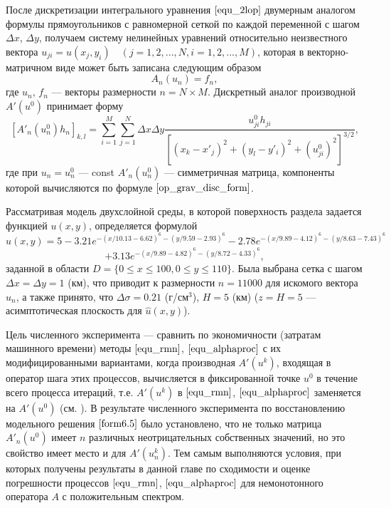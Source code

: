 После дискретизации интегрального уравнения $\eqref{equ_2lop}$ двумерным аналогом формулы прямоугольников с равномерной сеткой по каждой переменной с шагом $\Delta x$, $\Delta y$, получаем систему нелинейных уравнений относительно неизвестного вектора $u_{ji}=u(x_j,y_i)\quad (j=1,2,...,N, i=1,2,...,M)$, которая в векторно-матричном виде может быть записана следующим образом
\begin{equation}\label{equ_snle}
	A_n(u_n)=f_n,
\end{equation}
где $u_n$, $f_n$ --- векторы размерности $n=N\times M$. Дискретный аналог производной $A'(u^0)$ принимает форму
\begin{equation}\label{op_grav_disc_form}
	[A'_n(u_n^0)h_n]_{k,l}=\sum\limits_{i=1}^{M}\sum\limits_{j=1}^{N}
	\Delta x\Delta y\frac{u^0_{ji}h_{ji}}{[(x_k-x'_j)^2+(y_l-y'_i)^2+(u^0_{ji})^2]^{3/2}},
\end{equation}
где при $u_n=u_{n}^{0}$ --- const $A'_n(u_n^0)$ --- симметричная матрица, компоненты которой вычисляются по формуле $\eqref{op_grav_disc_form}$.

Рассматривая модель двухслойной среды, в которой поверхность раздела задается функцией $u(x,y)$, определяется формулой \cite[c.~160]{AkMisSkTr2015}
$$
\hat{u}(x,y)=5-3.21e^{-(x/10.13-6.62)^6-(y/9.59-2.93)^6}-
2.78e^{-(x/9.89-4.12)^6-(y/8.63-7.43)^6}$$
\begin{equation}\label{form6.5}
+3.13e^{-(x/9.89-4.82)^6-(y/8.72-4.33)^6},
\end{equation}
заданной в области $D=\{0\le x\le 100, 0\le y \le 110\}$. Была выбрана сетка с шагом $\Delta x=\Delta y=1$ (км), что приводит к размерности $n=11000$ для искомого вектора $u_n$, а также принято, что $\Delta\sigma=0.21$ (г/см$^3$), $H=5$ (км) ($z=H=5$ --- асимптотическая плоскость для $\hat{u}(x,y)$).

Цель численного эксперимента --- сравнить по экономичности (затратам машинного времени) методы $\eqref{equ_rmn}$, $\eqref{equ_alphaproc}$ с их модифицированными вариантами, когда производная $A'(u^k)$, входящая в оператор шага этих процессов, вычисляется в фиксированной точке $u^0$ в течение всего процесса итераций, т.е. $A'(u^k)$ в $\eqref{equ_rmn}$, $\eqref{equ_alphaproc}$ заменяется на $A'(u^0)$ (см. \cite{Vasin2014, Vasin2016}). В результате численного эксперимента по восстановлению модельного решения $\eqref{form6.5}$ было установлено, что не только матрица $A'_n(u^0)$ имеет $n$ различных неотрицательных собственных значений, но это свойство имеет место и для $A'(u_n^k)$. Тем самым выполняются условия, при которых получены результаты в данной главе по сходимости и оценке погрешности процессов $\eqref{equ_rmn}$, $\eqref{equ_alphaproc}$ для немонотонного оператора $A$ с положительным спектром. 


